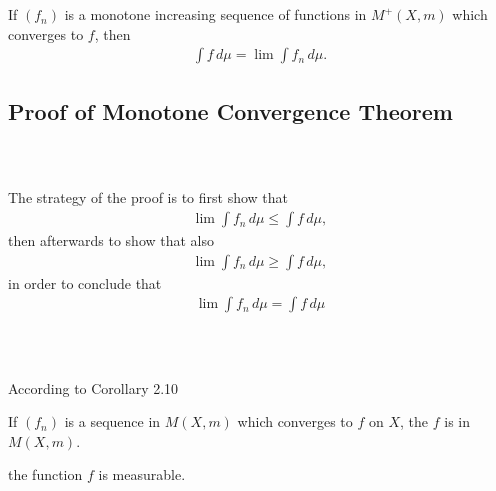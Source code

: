 \documentclass{beamer}
\numberwithin{equation}{section}
\begin{document}
\begin{frame}\frametitle{{\normalsize \secname} \\ {\large \subsecname}}
    \begin{theorem}
        If $(f_n)$ is a monotone increasing sequence of functions in $M^+(X,m)$ which converges to $f$, then
        \begin{align}\label{eq:b4.6}
            \int f \,d\mu = \lim \int f_n  \,d\mu. 
        \end{align}
    \end{theorem}
\end{frame}

\subsection{Proof of Monotone Convergence Theorem}

\begin{frame}\frametitle{{\normalsize \secname} \\ {\large \subsecname}}
    The strategy of the proof is to first show that
    \begin{align}
        \lim \int f_n \, d\mu \leq \int f \, d\mu,
    \end{align}
    then afterwards to show that also
    \begin{align}
        \lim \int f_n \, d\mu \geq \int f \, d\mu,
    \end{align}
    in order to conclude that
    \begin{align}
        \lim \int f_n \, d\mu = \int f \, d\mu
    \end{align}
\end{frame}

\begin{frame}\frametitle{{\normalsize \secname} \\ {\large \subsecname}}
    According to Corollary 2.10
    \begin{corollary}[2.10]
        If $(f_n)$ is a sequence in $M(X,m)$ which converges to $f$ on $X$, the $f$ is in $M(X,m)$.
    \end{corollary}
    the function $f$ is measurable.
\end{frame}
\end{document}
